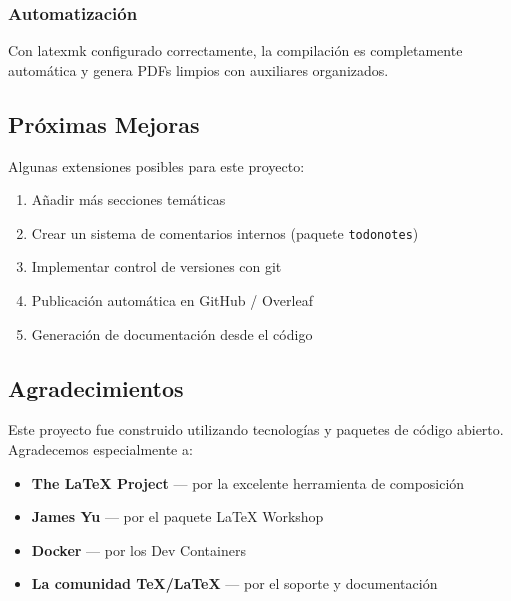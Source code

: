 \documentclass[/work/src/main.tex]{subfiles}
\begin{document}
\subsubsection{Automatización}
Con latexmk configurado correctamente, la compilación es completamente automática y genera PDFs limpios con auxiliares organizados.

\subsection{Próximas Mejoras}
Algunas extensiones posibles para este proyecto:

\begin{enumerate}
    \item Añadir más secciones temáticas
    \item Crear un sistema de comentarios internos (paquete \texttt{todonotes})
    \item Implementar control de versiones con git
    \item Publicación automática en GitHub / Overleaf
    \item Generación de documentación desde el código
\end{enumerate}

\subsection{Agradecimientos}
Este proyecto fue construido utilizando tecnologías y paquetes de código abierto. Agradecemos especialmente a:

\begin{itemize}
    \item \textbf{The LaTeX Project} — por la excelente herramienta de composición
    \item \textbf{James Yu} — por el paquete LaTeX Workshop
    \item \textbf{Docker} — por los Dev Containers
    \item \textbf{La comunidad TeX/LaTeX} — por el soporte y documentación
\end{itemize}
\end{document}
